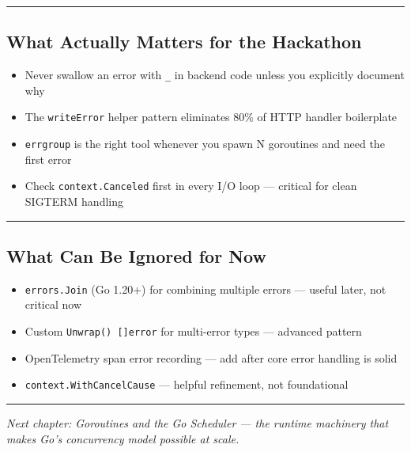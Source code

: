 \documentclass[
]{article}
\providecommand{\tightlist}{%
  \setlength{\itemsep}{0pt}\setlength{\parskip}{0pt}}
\begin{document}
\begin{center}\rule{0.5\linewidth}{0.5pt}\end{center}

\hypertarget{what-actually-matters-for-the-hackathon-3}{%
\subsection{What Actually Matters for the
Hackathon}\label{what-actually-matters-for-the-hackathon-3}}

\begin{itemize}
\tightlist
\item
  Never swallow an error with \texttt{\_} in backend code unless you
  explicitly document why
\item
  The \texttt{writeError} helper pattern eliminates 80\% of HTTP handler
  boilerplate
\item
  \texttt{errgroup} is the right tool whenever you spawn N goroutines
  and need the first error
\item
  Check \texttt{context.Canceled} first in every I/O loop --- critical
  for clean SIGTERM handling
\end{itemize}

\begin{center}\rule{0.5\linewidth}{0.5pt}\end{center}

\hypertarget{what-can-be-ignored-for-now-3}{%
\subsection{What Can Be Ignored for
Now}\label{what-can-be-ignored-for-now-3}}

\begin{itemize}
\tightlist
\item
  \texttt{errors.Join} (Go 1.20+) for combining multiple errors ---
  useful later, not critical now
\item
  Custom \texttt{Unwrap()\ {[}{]}error} for multi-error types ---
  advanced pattern
\item
  OpenTelemetry span error recording --- add after core error handling
  is solid
\item
  \texttt{context.WithCancelCause} --- helpful refinement, not
  foundational
\end{itemize}

\begin{center}\rule{0.5\linewidth}{0.5pt}\end{center}

\emph{Next chapter: Goroutines and the Go Scheduler --- the runtime
machinery that makes Go's concurrency model possible at scale.}
\end{document}
